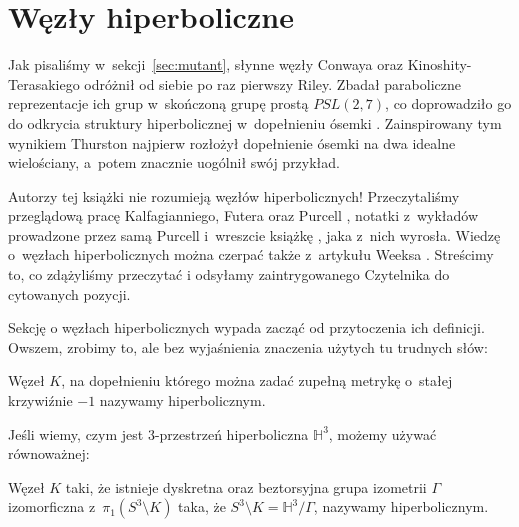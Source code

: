 

\section{Węzły hiperboliczne}
%
\label{sec:hyperbolic}%
Jak pisaliśmy w~sekcji~\ref{sec:mutant}, słynne węzły Conwaya oraz Kinoshity-Terasakiego odróżnił od siebie po raz pierwszy Riley.
%
%
%
Zbadał paraboliczne reprezentacje ich grup w~skończoną grupę prostą $PSL(2, 7)$, co doprowadziło go do odkrycia struktury hiperbolicznej w~dopełnieniu ósemki \cite{riley1975}.
%
Zainspirowany tym wynikiem Thurston najpierw rozłożył dopełnienie ósemki na dwa idealne wielościany, a~potem znacznie uogólnił swój przykład.
%

Autorzy tej książki nie rozumieją węzłów hiperbolicznych!
Przeczytaliśmy przeglądową pracę Kalfagianniego, Futera oraz Purcell \cite{purcell2019}, notatki z~wykładów prowadzone przez samą Purcell i~wreszcie książkę \cite{purcell2020}, jaka z~nich wyrosła.
%
%
%
Wiedzę o~węzłach hiperbolicznych można czerpać także z~artykułu Weeksa \cite{weeks2005}.
%
Streścimy to, co zdążyliśmy przeczytać i odsyłamy zaintrygowanego Czytelnika do cytowanych pozycji.

Sekcję o węzłach hiperbolicznych wypada zacząć od przytoczenia ich definicji.
Owszem, zrobimy to, ale bez wyjaśnienia znaczenia użytych tu trudnych słów:

\begin{definition}[hiperboliczny]
    Węzeł $K$, na dopełnieniu którego można zadać zupełną metrykę o~stałej krzywiźnie $-1$ nazywamy hiperbolicznym.
\end{definition}

Jeśli wiemy, czym jest 3-przestrzeń hiperboliczna $\mathbb H^3$, możemy używać równoważnej:

\begin{definition}
    Węzeł $K$ taki, że istnieje dyskretna oraz beztorsyjna grupa izometrii $\Gamma$ izomorficzna z~$\pi_1(S^3 \setminus K)$ taka, że $S^3 \setminus K = \mathbb H^3 / \Gamma$, nazywamy hiperbolicznym.
\end{definition}

